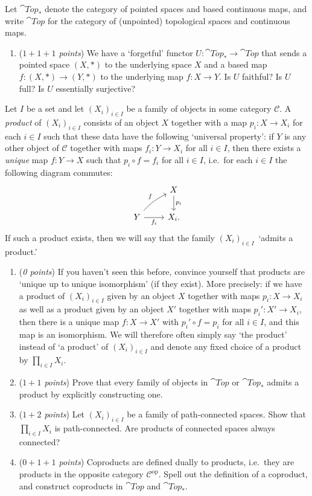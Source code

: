 \begin{sheetexercise}
Let $\cat{Top}_*$ denote the category of pointed spaces and based continuous maps, and write $\cat{Top}$ for the category of (unpointed) topological spaces and continuous maps.
\begin{enumerate}
\item (\textit{$1+1+1$ points}) We have a `forgetful' functor $U\colon\cat{Top}_*\to\cat{Top}$ that sends a pointed space $(X,*)$ to the underlying space $X$ and a based map $f\colon (X,*)\to (Y,*)$ to the underlying map $f\colon X\to Y$. Is $U$ faithful? Is $U$ full? Is $U$ essentially surjective?
\end{enumerate}
Let $I$ be a set and let $(X_i)_{i\in I}$ be a family of objects in some category $\mathscr C$. A \emph{product} of $(X_i)_{i\in I}$ consists of an object $X$ together with a map $p_i\colon X\to X_i$ for each $i\in I$ such that these data have the following `universal property': if $Y$ is any other object of $\mathscr C$ together with maps $f_i\colon Y\to X_i$ for all $i\in I$, then there exists a \emph{unique} map $f\colon Y\to X$ such that $p_i\circ f=f_i$ for all $i\in I$, i.e.~for each $i\in I$ the following diagram commutes:
\begin{equation*}
\begin{tikzcd}
& X\arrow[d, "p_i"]\\
Y\arrow[ur, "f", bend left=10pt]\arrow[r, "f_i"'] & X_i.
\end{tikzcd}
\end{equation*}
If such a product exists, then we will say that the family $(X_i)_{i\in I}$~`admits a product.'
\begin{enumerate}[resume]
\item (\textit{0 points}) If you haven't seen this before, convince yourself that products are `unique up to unique isomorphism' (if they exist). More precisely: if we have a product of $(X_i)_{i\in I}$ given by an object $X$ together with maps $p_i\colon X\to X_i$ as well as a product given by an object $X'$ together with maps $p_i'\colon X'\to X_i$, then there is a unique map $f\colon X\to X'$ with $p_i'\circ f=p_i$ for all $i\in I$, and this map is an isomorphism. We will therefore often simply say `the product' instead of `a product' of $(X_i)_{i\in I}$ and denote any fixed choice of a product by $\prod_{i\in I}X_i$.
\item (\textit{$1+1$ points}) Prove that every family of objects in $\cat{Top}$ or $\cat{Top}_*$ admits a product by explicitly constructing one.
\item (\textit{$1+2$ points}) Let $(X_i)_{i\in I}$ be a family of path-connected spaces. Show that $\prod_{i\in I}X_i$ is path-connected. Are products of connected spaces always connected?
\item (\textit{$0+1+1$ points}) Coproducts are defined dually to products, i.e.~they are products in the opposite category $\mathscr C^{\text{op}}$. Spell out the definition of a coproduct, and construct coproducts in $\cat{Top}$ and $\cat{Top}_*$.
\end{enumerate}
\end{sheetexercise}

